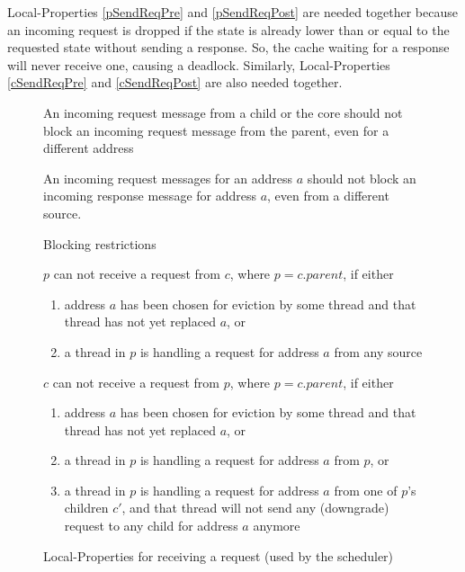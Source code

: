 Local-Properties \ref{pSendReqPre} and \ref{pSendReqPost} are needed together
because an incoming request is dropped if the state is already lower than or
equal to the requested state without sending a response. So, the cache waiting
for a response will never receive one, causing a deadlock.  Similarly,
Local-Properties \ref{cSendReqPre} and \ref{cSendReqPost} are also needed
together.

\begin{figure}\small
\begin{inv}
An incoming request message from a child or the core should not block an
incoming request message from the parent, even for a different
address\label{cReqNoBlockPReq}
\end{inv}
\begin{inv}
An incoming request messages for an address $a$ should not block an incoming
response message for address $a$, even from a different
source.\label{reqNoBlockResp}
\end{inv}
\caption{Blocking restrictions}
\label{blocking}
\end{figure}

\begin{figure}\small
\begin{inv}
$p$ can not receive a request  from $c$, where $p = c.parent$,
if either
\begin{enumerate}
\item address $a$ has been chosen for eviction by some thread and that thread
has not yet replaced $a$, or
\item a thread in $p$ is handling a request for address
$a$ from any source
\end{enumerate}
\label{pHandleReq}
\end{inv}
\begin{inv}
$c$ can not receive a request  from $p$, where $p = c.parent$,
if either
\begin{enumerate}
\item address $a$ has been chosen for eviction by some thread and that thread
has not yet replaced $a$, or
\item a thread in $p$ is handling a request for address
$a$ from $p$, or
\item a thread in $p$ is handling a request for address
$a$ from one of $p$'s children $c'$, and that thread will not send any
(downgrade) request to any child for address $a$ anymore
\end{enumerate}
\label{cHandleReq}
\end{inv}
\caption{Local-Properties for receiving a request (used by the scheduler)}\label{recvReq}
\end{figure}

